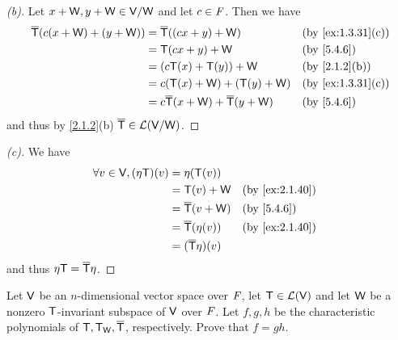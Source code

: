\begin{proof}[(b)]
  Let \(x + \mathsf{W}, y + \mathsf{W} \in \mathsf{V} / \mathsf{W}\) and let \(c \in \mathit{F}\).
  Then we have
  \begin{align*}
    \overline{\T}(c(x + \W) + (y + \W)) & = \overline{\T}((cx + y) + \W)                    &  & \by{ex:1.3.31}[c] \\
                                        & = \T(cx + y) + \W                                 &  & \by{5.4.6}        \\
                                        & = (c \T(x) + \T(y)) + \W                          &  & \by{2.1.2}[b]     \\
                                        & = c (\T(x) + \W) + (\T(y) + \W)                   &  & \by{ex:1.3.31}[c] \\
                                        & = c \overline{\T}(x + \W) + \overline{\T}(y + \W) &  & \by{5.4.6}
  \end{align*}
  and thus by \cref{2.1.2}(b) \(\overline{\mathsf{T}} \in \mathcal{L}(\mathsf{V} / \mathsf{W})\).
\end{proof}

\begin{proof}[(c)]
  We have
  \begin{align*}
    \forall v \in \V, (\eta \T)(v) & = \eta(\T(v))                                 \\
                                   & = \T(v) + \W              &  & \by{ex:2.1.40} \\
                                   & = \overline{\T}(v + \W)   &  & \by{5.4.6}     \\
                                   & = \overline{\T}(\eta(v))  &  & \by{ex:2.1.40} \\
                                   & = (\overline{\T} \eta)(v)
  \end{align*}
  and thus \(\eta \mathsf{T} = \overline{\mathsf{T}} \eta\).
\end{proof}

\begin{ex}\label{ex:5.4.28}
  Let \(\mathsf{V}\) be an \(n\)-dimensional vector space over \(\mathit{F}\), let \(\mathsf{T} \in \mathcal{L}(\mathsf{V})\) and let \(\mathsf{W}\) be a nonzero \(\mathsf{T}\)-invariant subspace of \(\mathsf{V}\) over \(\mathit{F}\).
  Let \(f, g, h\) be the characteristic polynomials of \(\mathsf{T}, \mathsf{T}_{\mathsf{W}}, \overline{\mathsf{T}}\), respectively.
  Prove that \(f = gh\).
\end{ex}

